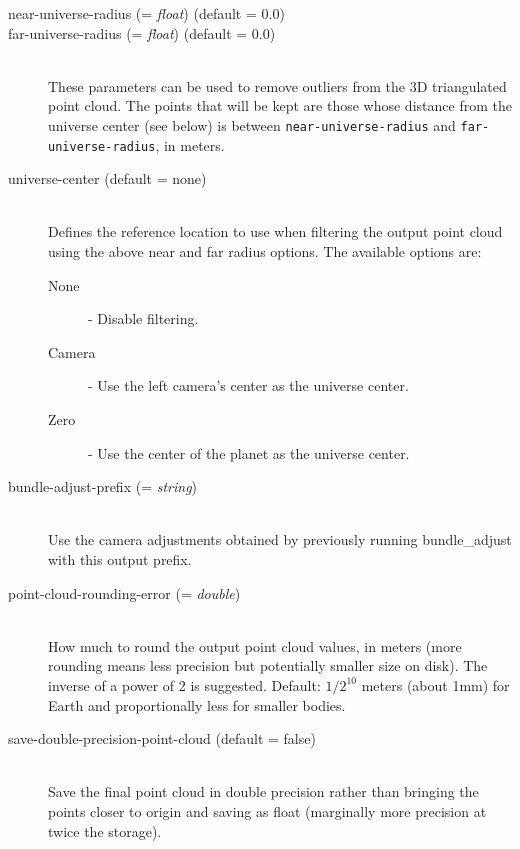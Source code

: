 \begin{description}
\item[near-universe-radius \textnormal{\small{(= \emph{float})}} (default = 0.0)]
\item[far-universe-radius \textnormal{\small{(= \emph{float})}} (default = 0.0)] \hfill \\

These parameters can be used to remove outliers from the 3D triangulated
point cloud. The points that will be kept are those whose distance from
the universe center (see below) is between \texttt{near-universe-radius}
and \texttt{far-universe-radius}, in meters.

\item[universe-center \textnormal (default = none)] \hfill \\
Defines the reference location to use when filtering the output point cloud
using the above near and far radius options. The available options
are:

  \begin{description}
    \item[None] - Disable filtering.
    \item[Camera] - Use the left camera's center as the universe center.
    \item[Zero]   - Use the center of the planet as the universe center.
  \end{description}

\item[bundle-adjust-prefix \textnormal{\small{(= \emph{string})}}] \hfill \\ Use the camera adjustments obtained by previously running bundle\_adjust with this output prefix.

\item[point-cloud-rounding-error \textnormal{\small{(= \emph{double})}}] \hfill \\

How much to round the output point cloud values, in meters (more
rounding means less precision but potentially smaller size on disk). The
inverse of a power of 2 is suggested. Default: $1/2^{10}$ meters (about 1mm) for Earth and
proportionally less for smaller bodies.

\item[save-double-precision-point-cloud \textnormal (default = false)] \hfill \\

Save the final point cloud in double precision rather than bringing the
points closer to origin and saving as float (marginally more precision
at twice the storage).


\end{description}
